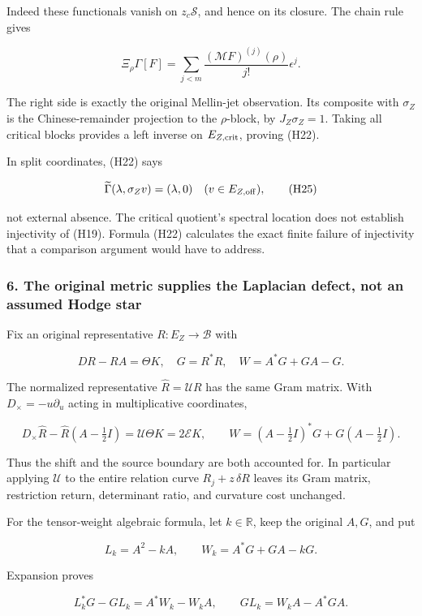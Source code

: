 Indeed these functionals vanish on \(z_c\mathcal S\), and hence on its closure. The chain rule gives

\[
\Xi_\rho\Gamma[F]=\sum_{j<m}\frac{(\mathcal MF)^{(j)}(\rho)}{j!}\epsilon^j.
\tag{H24}
\]

The right side is exactly the original Mellin-jet observation. Its composite with \(\sigma_Z\) is the Chinese-remainder projection to the \(\rho\)-block, by \(J_Z\sigma_Z=1\). Taking all critical blocks provides a left inverse on \(E_{Z,\rm crit}\), proving (H22).

In split coordinates, (H22) says

\[
\widetilde\Gamma(\lambda,\sigma_Zv)=(\lambda,0)
\quad(v\in E_{Z,\rm off}),
\tag{H25}
\]

not external absence. The critical quotient's spectral location does not establish injectivity of (H19). Formula (H22) calculates the exact finite failure of injectivity that a comparison argument would have to address.

\subsubsection{6. The original metric supplies the Laplacian defect, not an assumed Hodge star}\label{endpoint-cc_hochschild--the-original-metric-supplies-the-laplacian-defect-not-an-assumed-hodge-star}

Fix an original representative \(R:E_Z\to\mathscr B\) with

\[
DR-RA=\Theta K,\quad G=R^*R,\quad W=A^*G+GA-G.
\tag{H26}
\]

The normalized representative \(\widehat R=\mathcal UR\) has the same Gram matrix. With \(D_\times=-u\partial_u\) acting in multiplicative coordinates,

\[
D_\times\widehat R-\widehat R(A-\tfrac12I)=\mathcal U\Theta K=2\mathcal EK,
\qquad
W=(A-\tfrac12I)^*G+G(A-\tfrac12I).
\tag{H27}
\]

Thus the shift and the source boundary are both accounted for. In particular applying \(\mathcal U\) to the entire relation curve \(R_j+z\,\delta R\) leaves its Gram matrix, restriction return, determinant ratio, and curvature cost unchanged.

For the tensor-weight algebraic formula, let \(k\in\mathbb R\), keep the original \(A,G\), and put

\[
L_k=A^2-kA,\qquad W_k=A^*G+GA-kG.
\tag{H28}
\]

Expansion proves

\[
\boxed{L_k^*G-GL_k=A^*W_k-W_kA,}\qquad
\boxed{GL_k=W_kA-A^*GA.}
\tag{H29}
\]

